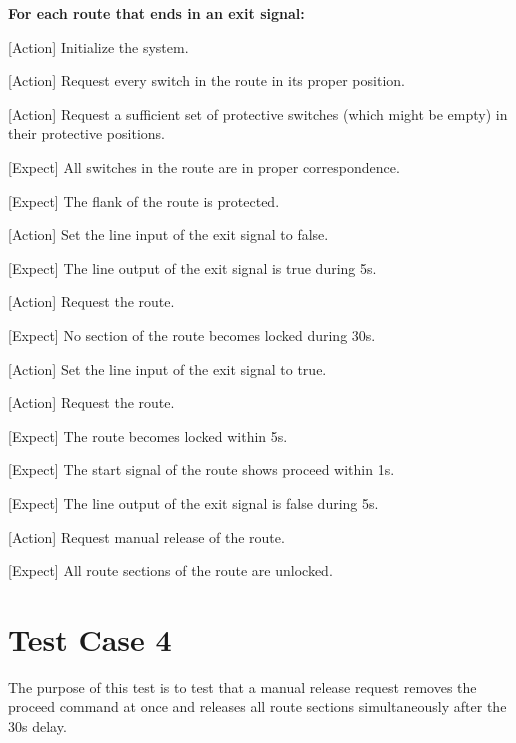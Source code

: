 \documentclass[10pt,a4paper]{article}
\begin{document}
\begin{procedurebox}
  \textbf{For each route that ends in an exit signal:}
  \begin{teststeps}
    \item \textnormal{[Action]} Initialize the system.
    \item \textnormal{[Action]} Request every switch in the route in its proper position.
    \item \textnormal{[Action]} Request a sufficient set of protective switches (which might be empty) in their protective positions.
    \item \textnormal{[Expect]} All switches in the route are in proper correspondence.
    \item \textnormal{[Expect]} The flank of the route is protected.
    \item \textnormal{[Action]} Set the line input of the exit signal to false.
    \item \textnormal{[Expect]} The line output of the exit signal is true during 5s.
    \item \textnormal{[Action]} Request the route.
    \item \textnormal{[Expect]} No section of the route becomes locked during 30s.
    \item \textnormal{[Action]} Set the line input of the exit signal to true.
    \item \textnormal{[Action]} Request the route.
    \item \textnormal{[Expect]} The route becomes locked within 5s.
    \item \textnormal{[Expect]} The start signal of the route shows proceed within 1s.
    \item \textnormal{[Expect]} The line output of the exit signal is false during 5s.
    \item \textnormal{[Action]} Request manual release of the route.
    \item \textnormal{[Expect]} All route sections of the route are unlocked.
    
  \end{teststeps}
\end{procedurebox}

\vspace{9mm}
\section{Test Case 4}
The purpose of this test is to test that a manual release request removes the proceed command at once and releases all route sections simultaneously after the 30s delay.
\end{document}
